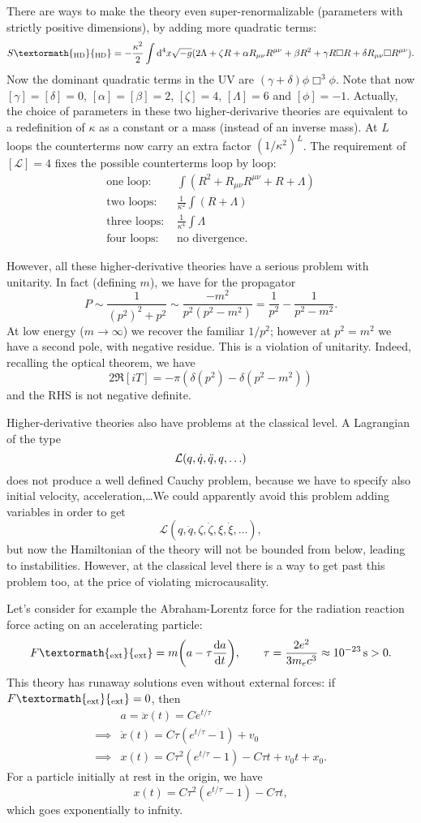 \documentclass[a4paper,12pt]{book}
\newcommand{\ped}[1]{\textormath{\textsubscript{#1}}{_{\mathrm{#1}}}}
\newcommand{\dd}{\mathop{\mathrm{d}\!}{}}
\theoremstyle{definition}
\theoremstyle{remark}
\let\dddot\relax
\begin{document}
There are ways to make the theory even super-renormalizable (parameters with strictly positive dimensions), by adding more quadratic terms:
\[S\ped{HD}=-\frac{\kappa^2}{2}\int\dd^4x\sqrt{-g}(2\Lambda+\zeta R+\alpha R_{\mu\nu}R^{\mu\nu}+\beta R^2+\gamma R\Box R+\delta R_{\mu\nu}\Box R^{\mu\nu}).\]
Now the dominant quadratic terms in the UV are $(\gamma+\delta)\phi\Box^3\phi$. Note that now $[\gamma]=[\delta]=0$, $[\alpha]=[\beta]=2$, $[\zeta]=4$, $[\Lambda]=6$ and $[\phi]=-1$. Actually, the choice of parameters in these two higher-derivarive theories are equivalent to a redefinition of $\kappa$ as a constant or a mass (instead of an inverse mass). At $L$ loops the counterterms now carry an extra factor $(1/\kappa^2)^L$. The requirement of $[\mathcal L]=4$ fixes the possible counterterms loop by loop:
\begin{align*}
\text{one loop: }&\int(R^2+R_{\mu\nu}R^{\mu\nu}+R+\Lambda)\\
\text{two loops: }&\frac1{\kappa^2}\int(R+\Lambda)\\
\text{three loops: }&\frac1{\kappa^4}\int\Lambda\\
\text{four loops: }&\text{no divergence.}
\end{align*}

However, all these higher-derivative theories have a serious problem with unitarity. In fact (defining $m$), we have for the propagator
\[P\sim\frac1{(p^2)^2+p^2}\sim\frac{-m^2}{p^2(p^2-m^2)}=\frac1{p^2}-\frac1{p^2-m^2}.\]
At low energy ($m\to\infty$) we recover the familiar $1/p^2$; however at $p^2=m^2$ we have a second pole, with negative residue. This is a violation of unitarity. Indeed, recalling the optical theorem, we have
\[2\Re[iT]=-\pi(\delta(p^2)-\delta(p^2-m^2))\]
and the RHS is not negative definite.

Higher-derivative theories also have problems at the classical level. A Lagrangian of the type
\[\mathcal L(q,\dot q, \ddot q, \dddot q,\ldots)\]
does not produce a well defined Cauchy problem, because we have to specify also initial velocity, acceleration,\ldots We could apparently avoid this problem adding variables in order to get
\[\mathcal L(q, \dot q, \zeta, \dot\zeta, \xi, \dot\xi,\ldots),\]
but now the Hamiltonian of the theory will not be bounded from below, leading to instabilities. However, at the classical level there is a way to get past this problem too, at the price of violating microcausality.

Let's consider for example the Abraham-Lorentz force for the radiation reaction force acting on an accelerating particle:
\[F\ped{ext}=m\biggl(a-\tau\frac{\dd a}{\dd t}\biggr),\qquad \tau=\frac{2e^2}{3m_ec^3}\approx\SI{e-23}{\second}>0.\]
This theory has runaway solutions even without external forces: if $F\ped{ext}=0$, then
\begin{align*}
&a=\ddot x(t)=Ce^{t/\tau}\\
\implies&\dot x(t)=C\tau(e^{t/\tau}-1)+v_0\\
\implies&x(t)=C\tau^2(e^{t/\tau}-1)-C\tau t+v_0t+x_0.
\end{align*}
For a particle initially at rest in the origin, we have
\[x(t)=C\tau^2(e^{t/\tau}-1)-C\tau t,\]
which goes exponentially to infnity.
\end{document}
